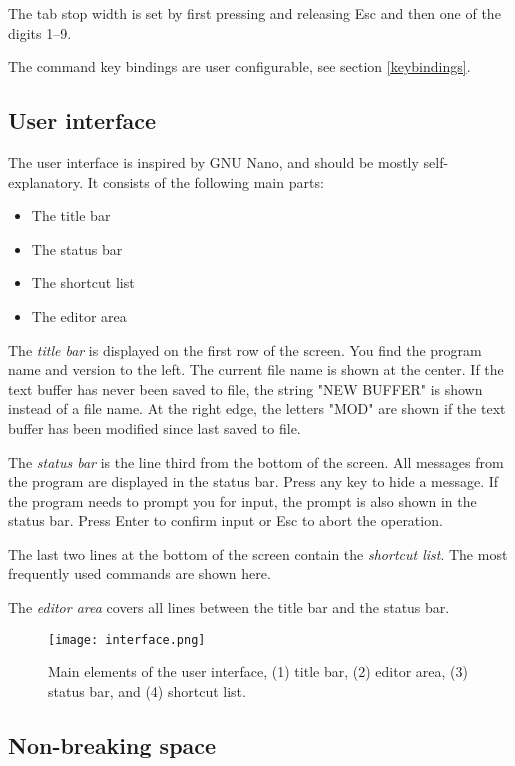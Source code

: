 \documentclass{article}
\begin{document}
        \noindent The tab stop width is set by first pressing and releasing Esc and then one of the digits 1--9.

        The command key bindings are user configurable, see section \ref{keybindings}.

    \subsection{User interface}
	
	The user interface is inspired by GNU Nano, and should be mostly self-explanatory. It consists of the following main parts:
	
	\begin{itemize}
		\item The title bar
		\item The status bar
		\item The shortcut list
		\item The editor area
	\end{itemize}
	
	\noindent The \textit{title bar} is displayed on the first row of the screen. You find the program name and version to the left. 
	The current file name is shown at the center. If the text buffer has never been saved to file, the string "NEW BUFFER" is
	shown instead of a file name. At the right edge, the letters "MOD" are shown if the text buffer has been modified
	since last saved to file.
	
	The \textit{status bar} is the line third from the bottom of the screen. All messages from the program are displayed in
	the status bar. Press any key to hide a message. If the program needs to prompt you for input, the prompt is also shown in the status bar. 
	Press Enter to confirm input or Esc to abort the operation.
	
	The last two lines at the bottom of the screen contain the \textit{shortcut list}. The most frequently used commands are
	shown here.
	
	The \textit{editor area} covers all lines between the title bar and the status bar. 

    \begin{figure}[H]
        \caption{Main elements of the user interface, (1) title bar, (2) editor area, (3) status bar, and (4) shortcut list.}
        \centering\texttt{[image: interface.png]}
    \end{figure}
	
	\subsection{Non-breaking space}
\end{document}
